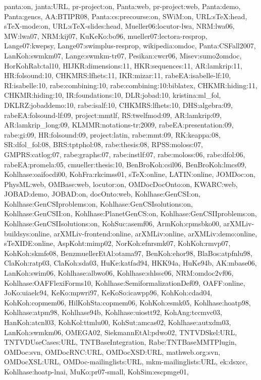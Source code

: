 {panta:on,
janta:URL,
pr-project:on,
Panta:web,
pr-project:web,
Panta:demo,
Panta:gencs,
AA:BTIPR08,
Panta:cs:precourse:on,
SWiM:on,
URL:sTeX:head,
sTeX-mode:on,
URL:sTeX-slides:head,
Mueller06:locutor-lwa,
NRM:lwa06,
MW:lwa07,
NRM:kij07,
KuKeKo:bo96,
mueller07:lectora-resprop,
Lange07:kwepsy,
Lange07:swimplus-resprop,
wikipedia:omdoc,
Panta:CSFall2007,
LanKoh:swmkm07,
Lange:swmkm-tr07,
Pesikan:cwcr06,
Misev:sumo2omdoc,
HorKohRab:tal10,
HIJKR:dimensions:11,
HKR:sequences:11,
AR:lamkrip:11,
HR:folsound:10,
CHKMRS:lfhets:11,
IKR:mizar:11,
rabeEA:isabelle-lf:10,
RI:isabelle:10,
rabe:combining:10,
rabe:combining:10:biblatex,
CHKMR:hiding:11, 
CHKMR:hiding:10,
IR:foundations:10,
DLR:jobad:10,
kristina:ml_fol,
DKLRZ:jobaddemo:10,
rabe:isalf:10,
CHKMRS:lfhets:10,
DHS:algebra:09,
rabeEA:folsound-lf:09,
project:mmtlf,
RS:twelfmod:09,
AR:lamkrip:09,
AR:lamkrip_long:09,
KLMMR:notations-tr:2009,
rabeEA:presentation:09,
rabe:gi:09,
HR:folsound:09,
project:latin,
rabe:mmt:09,
RK:keappa:08,
SR:dfol_fol:08,
BRS:tptphol:08,
rabe:thesis:08,
RPSS:moloss:07,
GMPRS:catlog:07,
rabe:graphs:07,
rabe:instlf:07,
rabe:moloss:06,
rabe:dfol:06,
rabeEA:promela:05,
cmueller:thesis:10,
BenBroKoh:csil06,
BenBroKoh:lmcs09,
Kohlhase:oaifocdi00,
KohFra:rkcimss01,
sTeX:online,
LATIN:online,
JOMDoc:on,
PhysML:web,
OMBase:web,
locutor:on,
OMDocDocOnto:on,
KWARC:web,
JOBAD:demo,
JOBAD:on,
docOnto:web,
Kohlhase:GenCSI:on,
Kohlhase:GenCSIproblems:on,
Kohlhase:GenCSIsolutions:on,
Kohlhase:GenCSII:on,
Kohlhase:PlanetGenCS:on,
Kohlhase:GenCSIIproblems:on,
Kohlhase:GenCSIIsolutions:on,
KohSuc:asemf06,
ArmKoh:cpmsbko00,
arXMLiv-buildsys:online,
arXMLiv-frontend:online,
arXMLiv:online,
arXMLiv:demo:online,
sTeXIDE:online,
AspKoht:mimp02,
NorKoh:efnrsmk07,
KohKoh:rmvp07,
KohKoh:skmfe08,
BenzmuellerEtAl:otama97,
BenKoh:ehor98,
BlaBos:atpfnlu98,
ClaKoh:ratp03,
ClaKoh:sda03,
HuKe:katfad94,
HKK94a,
HuKe94b,
AK:mbase06,
LanKoh:swim06,
Kohlhase:albwo06,
Kohlhase:shlssc06,
NRM:omdoc2vf06,
Kohlhase:OAFFlexiForms10,
Kohlhase:SemiformalizationDef09,
OAFF:online,
JoKo:uiaelc94,
KeKo:mpwri97,
KeKoSo:icawpp96,
KohKoh:cdad04,
KohKoh:copmem06,
HilKohSta:copmem06,
KohKoh:esmk05,
Kohlhase:hoatp98,
Kohlhase:atpm98,
Kohlhase94b,
Kohlhase:uiostt92,
KohAng:tccmvc03,
HanKoh:atcnl03,
KohKol:ttmlu00,
KohSut:amcas02,
Kohlhase:autxdm03,
LanKoh:swmkm06,
OMEGA02,
SiekmannEtAl:pdwo02,
TNTVDSkel:URL,
TNTVDUseCases:URL,
TNTBaseIntegration,
Rabe:TNTBaseMMTPlugin,
OMDoc:svn,
OMDocRNC:URL,
OMDocXSD:URL,
mathweb.org:svn,
OMDocXSL:URL,
OMDoc-mailinglists:URL,
mkm-mailinglists:URL,
ek:dsxcc,
Kohlhase:hoatp-lnai,
MuKo:pr07-small,
KohSim:escpmge01,
}
